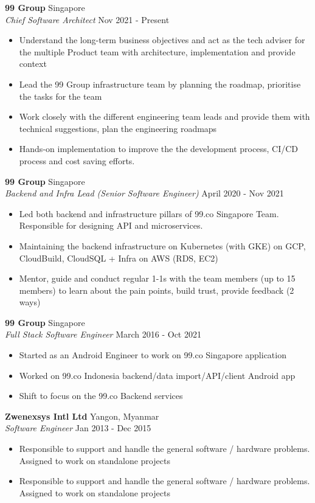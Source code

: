 \documentclass[a4paper]{article}
\begin{document}
\textbf{99 Group} \hfill Singapore\\
\textit{Chief Software Architect} \hfill Nov 2021 - Present\\
\vspace{-1mm}
\begin{itemize} \itemsep 1pt
	\item Understand the long-term business objectives and act as the tech adviser for the multiple Product team with architecture, implementation and provide context
	\item Lead the 99 Group infrastructure team by planning the roadmap, prioritise the tasks for the team
	\item Work closely with the different engineering team leads and provide them with technical suggestions, plan the engineering roadmaps
	\item Hands-on implementation to improve the the development process, CI/CD process and cost saving efforts.
\end{itemize}
\textbf{99 Group} \hfill Singapore\\
\textit{Backend and Infra Lead (Senior Software Engineer)} \hfill April 2020 - Nov 2021\\
\vspace{-1mm}
\begin{itemize} \itemsep 1pt
	\item Led both backend and infrastructure pillars of 99.co Singapore Team. Responsible for designing API and microservices.
	\item Maintaining the backend infrastructure on Kubernetes (with GKE) on GCP, CloudBuild, CloudSQL + Infra on AWS (RDS, EC2)
	\item Mentor, guide and conduct regular 1-1s with the team members (up to 15 members) to learn about the pain points, build trust, provide feedback (2 ways)
\end{itemize}
\textbf{99 Group} \hfill Singapore\\
\textit{Full Stack Software Engineer} \hfill March 2016 - Oct 2021\\
\vspace{-1mm}
\begin{itemize} \itemsep 1pt
	\item Started as an Android Engineer to work on 99.co Singapore application
	\item Worked on 99.co Indonesia backend/data import/API/client Android app
	\item Shift to focus on the 99.co Backend services
\end{itemize}
\textbf{Zwenexsys Intl Ltd} \hfill Yangon, Myanmar\\
\textit{Software Engineer} \hfill Jan 2013 - Dec 2015\\
\vspace{-1mm}
\begin{itemize} \itemsep 1pt
	\item Responsible to support and handle the general software / hardware problems. Assigned to work on standalone projects
	\item Responsible to support and handle the general software / hardware problems. Assigned to work on standalone projects
\end{itemize}
\end{document}
